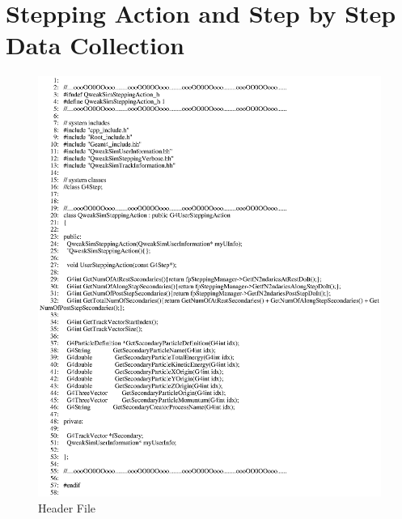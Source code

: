 \chapter{Stepping Action and Step by Step Data Collection}\label{CHP_XVI}

\clearpage
\begin{figure}[h]
  \hspace{0cm}
  \includegraphics[scale=0.8]{./figures16/QweakSimSteppingAction.hh-p1.eps}
  \caption{Header File}
           \label{fig:XVI-SC-1}
\end{figure}
\clearpage

